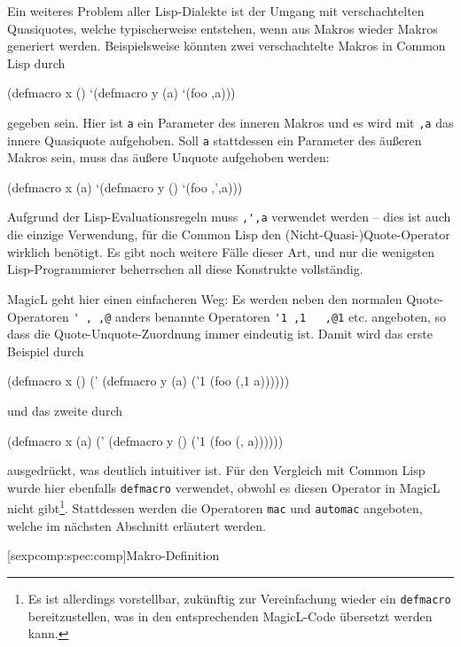 \documentclass[12pt, a4paper, bibgerm]{scrbook}
\newcommand\icode[1]{\lstinline?#1?}
\newcommand\lsubsection{}
\begin{document}
Ein weiteres Problem aller Lisp-Dialekte ist der Umgang mit
verschachtelten Quasiquotes, welche typischerweise entstehen, wenn aus
Makros wieder Makros generiert werden. Beispielsweise könnten zwei
verschachtelte Makros in Common Lisp durch
\begin{code}
(defmacro x ()
  `(defmacro y (a)
      `(foo ,a)))
\end{code}
gegeben sein. Hier ist \icode{a} ein Parameter des inneren Makros und es
wird mit \icode{,a} das innere Quasiquote aufgehoben. Soll \icode{a}
stattdessen ein Parameter des äußeren Makros sein, muss das äußere
Unquote aufgehoben werden:
\begin{code}
(defmacro x (a)
  `(defmacro y ()
      `(foo ,',a)))
\end{code}
Aufgrund der Lisp-Evaluationsregeln muss \icode{,',a} verwendet werden
-- dies ist auch die einzige Verwendung, für die Common Lisp den
(Nicht-Quasi-)Quote-Operator wirklich benötigt. Es gibt noch weitere
Fälle dieser Art, und nur die wenigsten Lisp-Programmierer beherrschen
all diese Konstrukte vollständig.

MagicL geht hier einen einfacheren Weg: Es werden neben den normalen
Quote-Operatoren \icode{' , ,@} anders benannte Operatoren \icode{'1 ,1
  ,@1} etc. angeboten, so dass die Quote-Unquote-Zuordnung immer
eindeutig ist. Damit wird das erste Beispiel durch
\begin{code}
(defmacro x ()
  (' (defmacro y (a)
       ('1 (foo (,1 a))))))
\end{code}
und das zweite durch
\begin{code}
(defmacro x (a)
  (' (defmacro y ()
       ('1 (foo (, a))))))
\end{code}
ausgedrückt, was deutlich intuitiver ist. Für den Vergleich mit Common
Lisp wurde hier ebenfalls \icode{defmacro} verwendet, obwohl es 
diesen Operator in MagicL nicht gibt\footnote{Es ist allerdings vorstellbar,
  zukünftig zur Vereinfachung wieder ein \icode{defmacro}
  bereitzustellen, was in den entsprechenden MagicL-Code übersetzt
  werden kann.}. Stattdessen werden die Operatoren \icode{mac} und
\icode{automac} angeboten, welche im nächsten Abschnitt erläutert
werden.

\lsubsection[sexpcomp:spec:comp]{Makro-Definition}
\end{document}
